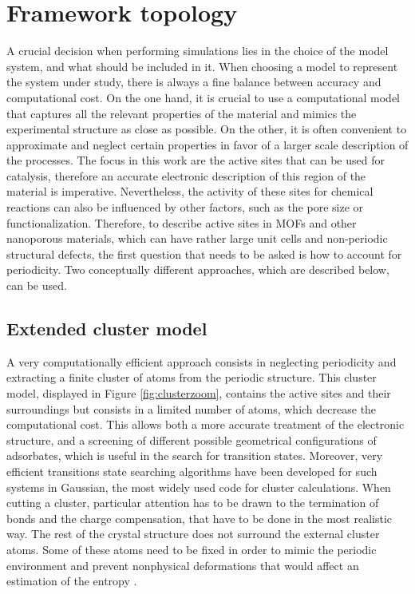 \section{Framework topology}
A crucial decision when performing simulations lies in the choice of the model system, and what should be included in it. When choosing a model to represent the system under study, there is always a fine balance between accuracy and computational cost. 
On the one hand, it is crucial to use a computational model that captures all the relevant properties of the material and mimics the experimental structure as close as possible. On the other, it is often convenient to approximate and neglect certain properties in favor of a larger scale description of the processes. The focus in this work are the active sites that can be used for catalysis, therefore an accurate electronic description of this region of the material is imperative. Nevertheless, the activity of these sites for chemical reactions can also be influenced by other factors, such as the pore size or functionalization. Therefore, to describe active sites in MOFs and other nanoporous materials, which can have rather large unit cells and non-periodic structural defects, the first question that needs to be asked is how to account for periodicity. Two conceptually different approaches, which are described below, can be used.

\subsection{Extended cluster model}
A very computationally efficient approach consists in neglecting periodicity and extracting a finite cluster of atoms from the periodic structure. This cluster model, displayed in Figure \ref{fig:clusterzoom}, contains the active sites and their surroundings but consists in a limited number of atoms, which decrease the computational cost. 
This allows both a more accurate treatment of the electronic structure, and a screening of different possible geometrical configurations of adsorbates, which is useful in the search for transition states. Moreover, very efficient transitions state searching algorithms have been developed for such systems in Gaussian, the most widely used code for cluster calculations.
When cutting a cluster, particular attention has to be drawn to the termination of bonds and the charge compensation, that have to be done in the most realistic way. The rest of the crystal structure does not surround the external cluster atoms. Some of these atoms need to be fixed in order to mimic the periodic environment and prevent nonphysical deformations that would affect an estimation of the entropy \cite{DeWispelaere2018}.

